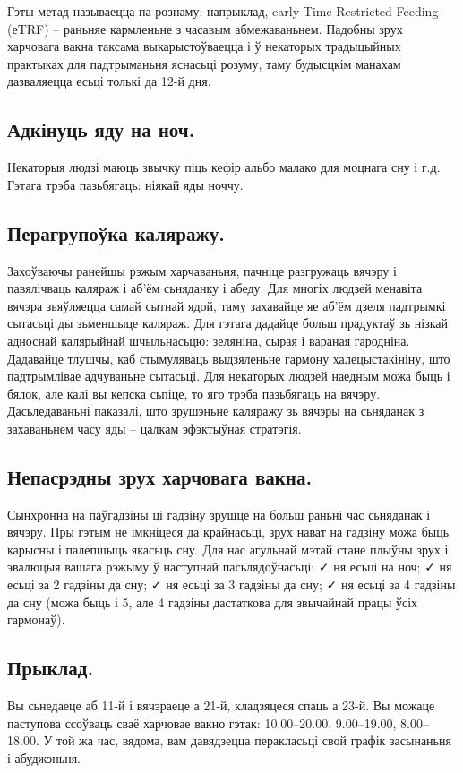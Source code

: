 Гэты метад называецца па-рознаму: напрыклад, early Time-Restricted Feeding (еTRF) – раньняе кармленьне з часавым абмежаваньнем. Падобны зрух харчовага вакна таксама выкарыстоўваецца і ў некаторых традыцыйных практыках для падтрыманьня яснасьці розуму, таму будысцкім манахам дазваляецца есьці толькі да 12-й дня.

\subsection{Адкінуць яду на ноч.}
Некаторыя людзі маюць звычку піць кефір альбо малако для моцнага сну і г.д. Гэтага трэба пазьбягаць: ніякай яды ноччу.

\subsection{Перагрупоўка каляражу.}
Захоўваючы ранейшы рэжым харчаваньня, пачніце разгружаць вячэру і павялічваць каляраж і аб'ём сьняданку і абеду. Для многіх людзей менавіта вячэра зьяўляецца самай сытнай ядой, таму захавайце яе аб'ём дзеля падтрымкі сытасьці ды зьменшыце каляраж. Для гэтага дадайце больш прадуктаў зь нізкай адноснай калярыйнай шчыльнасьцю: зеляніна, сырая і вараная гародніна. Дадавайце тлушчы, каб стымуляваць выдзяленьне гармону халецыстакініну, што падтрымлівае адчуваньне сытасьці. Для некаторых людзей наедным можа быць і бялок, але калі вы кепска сьпіце, то яго трэба пазьбягаць на вячэру. Дасьледаваньні паказалі, што зрушэньне каляражу зь вячэры на сьняданак з захаваньнем часу яды – цалкам эфэктыўная стратэгія.

\subsection{Непасрэдны зрух харчовага вакна.}
Сынхронна на паўгадзіны ці гадзіну зрушце на больш раньні час сьняданак і вячэру. Пры гэтым не імкніцеся да крайнасьці, зрух нават на гадзіну можа быць карысны і палепшыць якасьць сну. Для нас агульнай мэтай стане плыўны зрух і эвалюцыя вашага рэжыму ў наступнай пасьлядоўнасьці:
✓ ня есьці на ноч;
✓ ня есьці за 2 гадзіны да сну;
✓ ня есьці за 3 гадзіны да сну;
✓ ня есьці за 4 гадзіны да сну (можа быць і 5, але 4 гадзіны дастаткова для звычайнай працы ўсіх гармонаў).

\subsection{Прыклад.}
Вы сьнедаеце аб 11-й і вячэраеце а 21-й, кладзяцеся спаць а 23-й. Вы можаце паступова ссоўваць сваё харчовае вакно гэтак: 10.00–20.00, 9.00–19.00, 8.00–18.00. У той жа час, вядома, вам давядзецца перакласьці свой графік засынаньня і абуджэньня.

